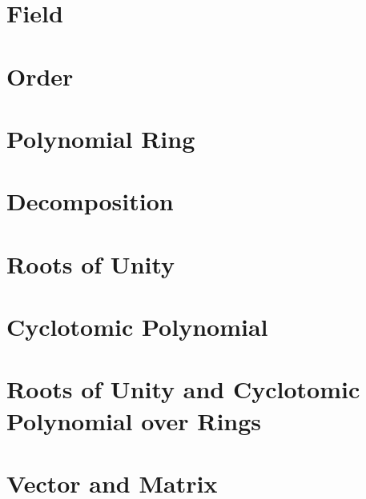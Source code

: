 \documentclass[11pt]{article}
\begin{document}
\section{Field}
\label{sec:field}


\clearpage

\section{Order}
\label{sec:order}




\clearpage

\section{Polynomial Ring}
\label{sec:polynomial-ring}


\clearpage

\section{Decomposition}
\label{sec:decomp}



\clearpage

\section{Roots of Unity}
\label{sec:roots}


\clearpage

\section{Cyclotomic Polynomial}
\label{sec:cyclotomic}


\clearpage

\section{Roots of Unity and Cyclotomic Polynomial over Rings}
\label{sec:cyclotomic-polynomial-integer-ring}


\clearpage

\section{Vector and Matrix}
\label{sec:matrix}

\end{document}
